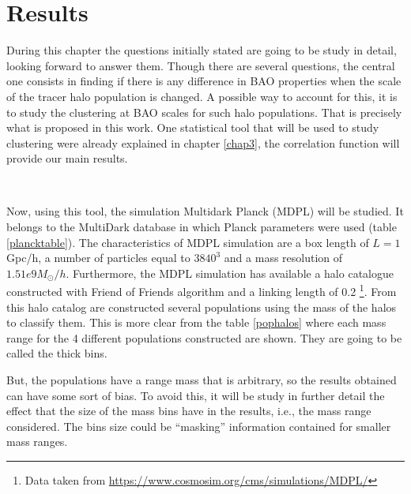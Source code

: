\chapter{ Results }

During this chapter the questions initially stated are going to be study in detail, 
looking forward to answer them. Though there are several questions, the central one
consists in finding if there is any difference in BAO properties when the scale of the tracer
halo population is changed. A possible way to account for this, it is to study the 
clustering at BAO scales for such halo populations. That is precisely what is proposed
in this work. 
One statistical tool that will be used to study clustering were already explained in chapter \ref{chap3},
the correlation function will provide our main results. 

\

Now, using this tool, the simulation Multidark Planck (MDPL) will be studied. 
It belongs to the MultiDark database in which Planck parameters were used
(table \ref{plancktable}). The characteristics of MDPL
simulation are a box length of $L=1$Gpc/h, a number of particles equal to 
$3840^3$ and a mass resolution of $1.51e9 M_{\odot}/h$.
Furthermore, the MDPL simulation has available a halo catalogue constructed with Friend of 
Friends algorithm and a linking length of 0.2 \footnote{ Data taken from \url{https://www.cosmosim.org/cms/simulations/MDPL/}}. 
From this halo catalog are constructed several populations using the mass of the halos to
classify them. This is more clear from the table \ref{pophalos} where each mass range for 
the 4 different populations constructed are shown. They are going to be called the 
thick bins. 

But, the populations have a range mass that is arbitrary, so
the results obtained can have some sort of bias. To avoid this, 
it will be study in further detail the effect that 
the size of the mass bins have in the results, i.e., the mass
range considered. The bins size could be ``masking'' information
contained for smaller mass ranges. 	

